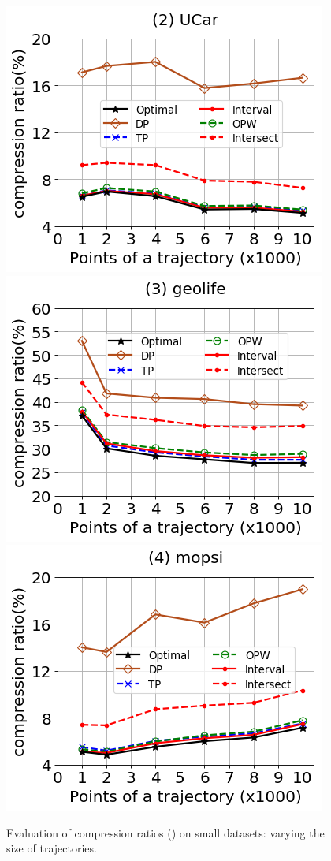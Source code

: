 \begin{figure}[tb!]
	\centering
	\includegraphics[scale=0.320]{Figures/Exp-DAD-CR-size-service.png} 	\hspace{3ex}
	\includegraphics[scale=0.320]{Figures/Exp-DAD-CR-size-geolife.png}	\hspace{3ex}
	\includegraphics[scale=0.320]{Figures/Exp-DAD-CR-size-mopsi.png}		
	\vspace{-2ex}
	\caption{\small Evaluation of compression ratios (\dad) on small datasets: varying the size of trajectories.}
	\label{fig:cr-dad-size}
	\vspace{-2ex}
\end{figure}

